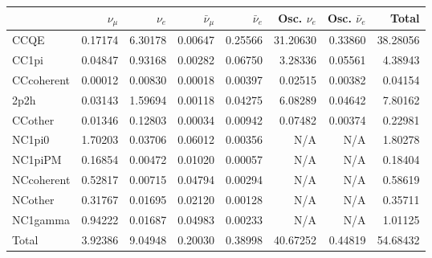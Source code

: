 \begin{tabular} { | l ||r | r | r | r | r | r | | r | }
\hline
              & $\nu_\mu$            & $\nu_e$              & $\bar{\nu}_{\mu}$    & $\bar{\nu}_{e}$      & Osc. $\nu_e$         & Osc. $\bar{\nu}_{e}$ & Total                \\ \hline\hline
 CCQE         & 0.17174              & 6.30178              & 0.00647              & 0.25566              & 31.20630             & 0.33860              & 38.28056             \\ \hline
 CC1pi        & 0.04847              & 0.93168              & 0.00282              & 0.06750              & 3.28336              & 0.05561              & 4.38943              \\ \hline
 CCcoherent   & 0.00012              & 0.00830              & 0.00018              & 0.00397              & 0.02515              & 0.00382              & 0.04154              \\ \hline
 2p2h         & 0.03143              & 1.59694              & 0.00118              & 0.04275              & 6.08289              & 0.04642              & 7.80162              \\ \hline
 CCother      & 0.01346              & 0.12803              & 0.00034              & 0.00942              & 0.07482              & 0.00374              & 0.22981              \\ \hline
 NC1pi0       & 1.70203              & 0.03706              & 0.06012              & 0.00356              & N/A                  & N/A                  & 1.80278              \\ \hline
 NC1piPM      & 0.16854              & 0.00472              & 0.01020              & 0.00057              & N/A                  & N/A                  & 0.18404              \\ \hline
 NCcoherent   & 0.52817              & 0.00715              & 0.04794              & 0.00294              & N/A                  & N/A                  & 0.58619              \\ \hline
 NCother      & 0.31767              & 0.01695              & 0.02120              & 0.00128              & N/A                  & N/A                  & 0.35711              \\ \hline
 NC1gamma     & 0.94222              & 0.01687              & 0.04983              & 0.00233              & N/A                  & N/A                  & 1.01125              \\ \hline
\hline
 Total        & 3.92386              & 9.04948              & 0.20030              & 0.38998              & 40.67252             & 0.44819              & 54.68432             \\ \hline

\end{tabular}
